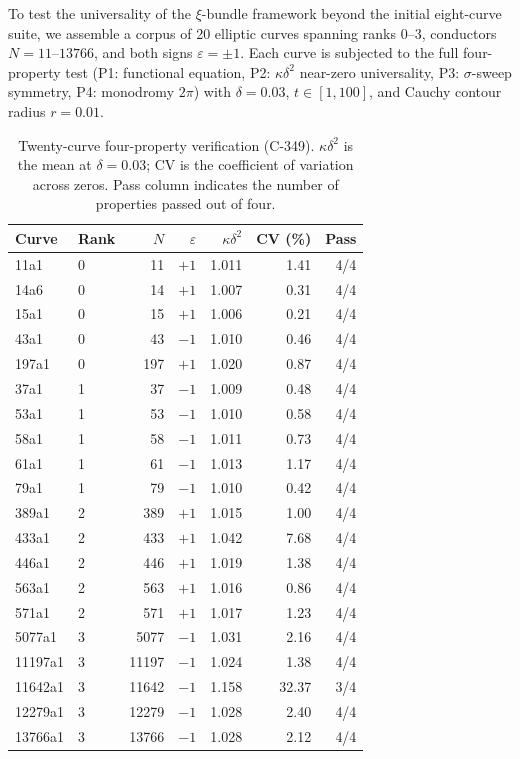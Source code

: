 \documentclass[11pt, a4paper]{article}
\theoremstyle{plain}
\theoremstyle{definition}
\begin{document}
To test the universality of the $\xi$-bundle framework beyond the
initial eight-curve suite, we assemble a corpus of 20 elliptic curves
spanning ranks $0$--$3$, conductors $N=11$--$13766$, and both signs
$\varepsilon=\pm 1$.  Each curve is subjected to the full four-property
test (P1: functional equation, P2: $\kappa\delta^{2}$ near-zero
universality, P3: $\sigma$-sweep symmetry, P4: monodromy $2\pi$) with
$\delta=0.03$, $t\in[1,100]$, and Cauchy contour radius $r=0.01$.

\begin{table}[ht]
\centering
\caption{Twenty-curve four-property verification (C-349).
  $\kappa\delta^{2}$ is the mean at $\delta=0.03$; CV is the
  coefficient of variation across zeros.  Pass column indicates the
  number of properties passed out of four.}
\label{tab:20curve}
\small
\begin{tabular}{llrrrrr}
\toprule
Curve & Rank & $N$ & $\varepsilon$ & $\kappa\delta^{2}$ & CV (\%) & Pass \\
\midrule
11a1    & 0 & 11    & $+1$ & 1.011 & 1.41 & 4/4 \\
14a6    & 0 & 14    & $+1$ & 1.007 & 0.31 & 4/4 \\
15a1    & 0 & 15    & $+1$ & 1.006 & 0.21 & 4/4 \\
43a1    & 0 & 43    & $-1$ & 1.010 & 0.46 & 4/4 \\
197a1   & 0 & 197   & $+1$ & 1.020 & 0.87 & 4/4 \\
\midrule
37a1    & 1 & 37    & $-1$ & 1.009 & 0.48 & 4/4 \\
53a1    & 1 & 53    & $-1$ & 1.010 & 0.58 & 4/4 \\
58a1    & 1 & 58    & $-1$ & 1.011 & 0.73 & 4/4 \\
61a1    & 1 & 61    & $-1$ & 1.013 & 1.17 & 4/4 \\
79a1    & 1 & 79    & $-1$ & 1.010 & 0.42 & 4/4 \\
\midrule
389a1   & 2 & 389   & $+1$ & 1.015 & 1.00 & 4/4 \\
433a1   & 2 & 433   & $+1$ & 1.042 & 7.68 & 4/4 \\
446a1   & 2 & 446   & $+1$ & 1.019 & 1.38 & 4/4 \\
563a1   & 2 & 563   & $+1$ & 1.016 & 0.86 & 4/4 \\
571a1   & 2 & 571   & $+1$ & 1.017 & 1.23 & 4/4 \\
\midrule
5077a1  & 3 & 5077  & $-1$ & 1.031 & 2.16 & 4/4 \\
11197a1 & 3 & 11197 & $-1$ & 1.024 & 1.38 & 4/4 \\
11642a1 & 3 & 11642 & $-1$ & 1.158 & 32.37 & 3/4 \\
12279a1 & 3 & 12279 & $-1$ & 1.028 & 2.40 & 4/4 \\
13766a1 & 3 & 13766 & $-1$ & 1.028 & 2.12 & 4/4 \\
\bottomrule
\end{tabular}
\end{table}
\end{document}
